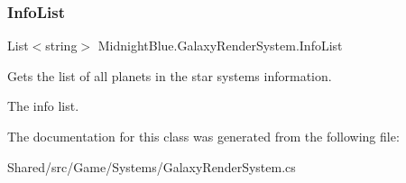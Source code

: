 \subsubsection{\texorpdfstring{Info\+List}{InfoList}}
{\footnotesize\ttfamily List$<$string$>$ Midnight\+Blue.\+Galaxy\+Render\+System.\+Info\+List\hspace{0.3cm}{\ttfamily [get]}}



Gets the list of all planets in the star system\textquotesingle{}s information. 

The info list.

The documentation for this class was generated from the following file\+:\begin{DoxyCompactItemize}
\item 
Shared/src/\+Game/\+Systems/Galaxy\+Render\+System.\+cs\end{DoxyCompactItemize}
